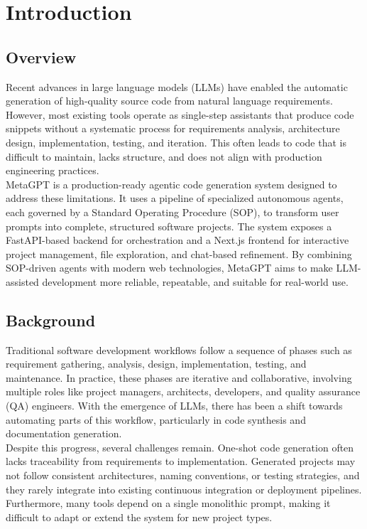 \chapter{Introduction}

\section{Overview}

Recent advances in large language models (LLMs) have enabled the automatic generation of high-quality source code from natural language requirements. However, most existing tools operate as single-step assistants that produce code snippets without a systematic process for requirements analysis, architecture design, implementation, testing, and iteration. This often leads to code that is difficult to maintain, lacks structure, and does not align with production engineering practices.\\

MetaGPT is a production-ready agentic code generation system designed to address these limitations. It uses a pipeline of specialized autonomous agents, each governed by a Standard Operating Procedure (SOP), to transform user prompts into complete, structured software projects. The system exposes a FastAPI-based backend for orchestration and a Next.js frontend for interactive project management, file exploration, and chat-based refinement. By combining SOP-driven agents with modern web technologies, MetaGPT aims to make LLM-assisted development more reliable, repeatable, and suitable for real-world use.\\

\section{Background}

Traditional software development workflows follow a sequence of phases such as requirement gathering, analysis, design, implementation, testing, and maintenance. In practice, these phases are iterative and collaborative, involving multiple roles like project managers, architects, developers, and quality assurance (QA) engineers. With the emergence of LLMs, there has been a shift towards automating parts of this workflow, particularly in code synthesis and documentation generation.\\

Despite this progress, several challenges remain. One-shot code generation often lacks traceability from requirements to implementation. Generated projects may not follow consistent architectures, naming conventions, or testing strategies, and they rarely integrate into existing continuous integration or deployment pipelines. Furthermore, many tools depend on a single monolithic prompt, making it difficult to adapt or extend the system for new project types.\\

